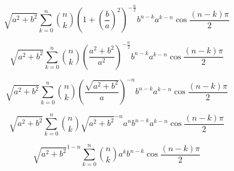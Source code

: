 \documentclass[a4paper]{article}
\begin{document}
	\[ \sqrt{a^{2} + b^{2}} \sum_{k=0}^{n} \binom{n}{k}
					       \left( 1 + \left( \frac{b}{a} \right) ^{2} \right)^{-\frac{n}{2}}
					       b^{n-k} a^{k-n}
					       \cos \frac{(n-k)\pi}{2} \]

	\[ \sqrt{a^{2} + b^{2}} \sum_{k=0}^{n} \binom{n}{k}
					       \left( \frac{a^{2} + b^{2}}{a^{2}} \right)^{-\frac{n}{2}}
					       b^{n-k} a^{k-n}
					       \cos \frac{(n-k)\pi}{2} \]

	\[ \sqrt{a^{2} + b^{2}} \sum_{k=0}^{n} \binom{n}{k}
					       \left( \frac{\sqrt{a^{2} + b^{2}}}{a} \right)^{-n}
					       b^{n-k} a^{k-n}
					       \cos \frac{(n-k)\pi}{2} \]

	\[ \sqrt{a^{2} + b^{2}} \sum_{k=0}^{n} \binom{n}{k}
					       \sqrt{a^{2} + b^{2}}^{-n}
					       a^{n}
					       b^{n-k} a^{k-n}
					       \cos \frac{(n-k)\pi}{2} \]

        \[ \sqrt{a^{2} + b^{2}}^{1-n} \sum_{k=0}^{n} \binom{n}{k}
						     a^{k} b^{n-k}
					             \cos \frac{(n-k)\pi}{2} \]
\end{document}
